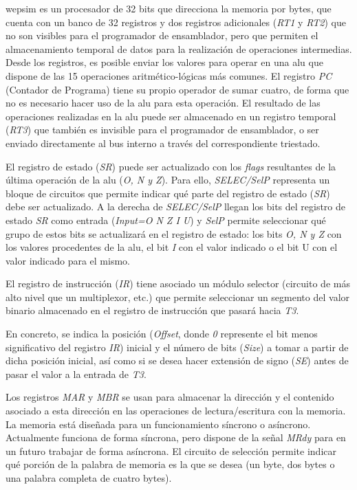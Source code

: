 \acrshort{wepsim} es un procesador de 32 bits que direcciona la memoria por bytes, que cuenta con un banco de 32 registros y dos registros adicionales (\emph{RT1} y \emph{RT2}) que no son visibles para el programador de \gls{ensamblador}, pero que permiten el almacenamiento temporal de datos para la realización de operaciones intermedias. Desde los registros, es posible enviar los valores para operar en una \acrfull{alu} que dispone de las 15 operaciones aritmético-lógicas más comunes. El registro \emph{PC} (Contador de Programa) tiene su propio operador de sumar cuatro, de forma que no es necesario hacer uso de la \acrshort{alu} para esta operación. El resultado de las operaciones realizadas en la \acrshort{alu} puede ser almacenado en un registro temporal (\emph{RT3}) que también es invisible para el programador de \gls{ensamblador}, o ser enviado directamente al bus interno a través del correspondiente triestado.

El registro de estado (\emph{SR}) puede ser actualizado con los \emph{flags} resultantes de la última operación de la \acrshort{alu} (\emph{O, N y Z}). Para ello, \emph{SELEC/SelP} representa un bloque de circuitos que permite indicar qué parte del registro de estado (\emph{SR}) debe ser actualizado. A la derecha de \emph{SELEC/SelP} llegan los bits del registro de estado \emph{SR} como entrada (\emph{Input=O N Z I U}) y \emph{SelP} permite seleccionar qué grupo de estos bits se actualizará en el registro de estado: los bits \emph{O, N y Z} con los valores procedentes de la \acrshort{alu}, el bit \emph{I} con el valor indicado o el bit U con el valor indicado para el mismo.

El registro de instrucción (\emph{IR}) tiene asociado un módulo selector (circuito de  más alto nivel que un multiplexor, etc.) que permite seleccionar un segmento del valor binario almacenado en el registro de instrucción que pasará hacia \emph{T3}.

En concreto, se indica la posición (\emph{Offset}, donde \emph{0} represente el bit menos significativo del registro \emph{IR}) inicial y el número de bits (\emph{Size}) a tomar a partir de dicha posición inicial, así como si se desea hacer extensión de signo (\emph{SE}) antes de pasar el valor a la entrada de \emph{T3}.

Los registros \emph{MAR} y \emph{MBR} se usan para almacenar la dirección y el contenido asociado a esta dirección en las operaciones de lectura/escritura con la memoria. La memoria está diseñada para un funcionamiento síncrono o asíncrono. Actualmente funciona de forma síncrona, pero dispone de la señal \emph{MRdy} para en un futuro trabajar de forma asíncrona. El circuito de selección permite indicar qué porción de la palabra de memoria es la que se desea (un byte, dos bytes o una palabra completa de cuatro bytes).

